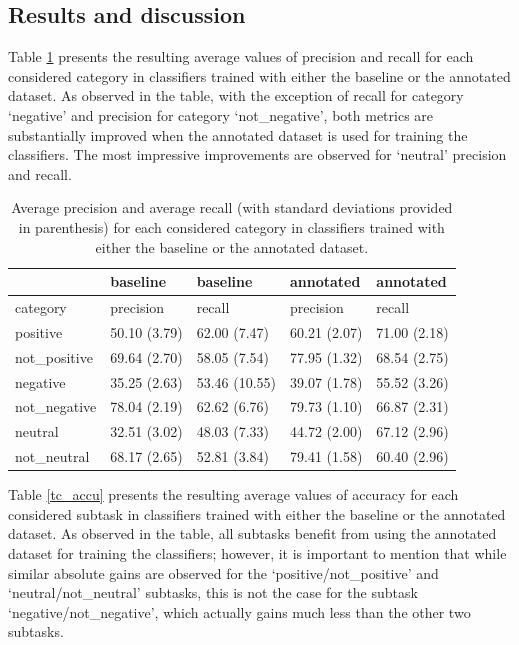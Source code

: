 \documentclass[11pt,letterpaper]{article}
\begin{document}
\subsection{Results and discussion}
Table \ref{tc_pre_rec} presents the resulting average values of precision and recall for each considered category 
in classifiers trained with either the baseline or the annotated dataset. As observed in the table, with the
exception of recall for category `negative' and precision for category `not\_negative', both metrics are substantially 
improved when the annotated dataset is used for training the classifiers. The most impressive improvements
are observed for `neutral' precision and recall. 

\begin{table}
\begin{tabular}{|l|l|l|l|l|}
\hline
&baseline &baseline &annotated &annotated \\ 
\hline
category &precision &recall &precision &recall \\ 
\hline
positive &50.10 (3.79) &62.00 (7.47) &60.21 (2.07) &71.00 (2.18) \\ 
\hline
not\_positive &69.64 (2.70) &58.05 (7.54) &77.95 (1.32) &68.54 (2.75) \\ 
\hline
negative &35.25 (2.63) &53.46 (10.55) &39.07 (1.78) &55.52 (3.26) \\ 
\hline
not\_negative &78.04 (2.19) &62.62 (6.76) &79.73 (1.10) &66.87 (2.31) \\ 
\hline
neutral &32.51 (3.02) &48.03 (7.33) &44.72 (2.00) &67.12 (2.96) \\ 
\hline
not\_neutral &68.17 (2.65) &52.81 (3.84) &79.41 (1.58) &60.40 (2.96) \\ 
\hline
\end{tabular}
\caption{Average precision and average recall (with standard deviations provided in parenthesis) 
for each considered category in classifiers trained with either the baseline or the annotated dataset.}
\label{tc_pre_rec}
\end{table}

Table \ref{tc_accu} presents the resulting average values of accuracy for each considered subtask 
in classifiers trained with either the baseline or the annotated dataset. As observed in the table,
all subtasks benefit from using the annotated dataset for training the classifiers; however, it is 
important to mention that while similar absolute gains are observed for the `positive/not\_positive' 
and `neutral/not\_neutral' subtasks, this is not the case for the subtask `negative/not\_negative', 
which actually gains much less than the other two subtasks.
\end{document}

